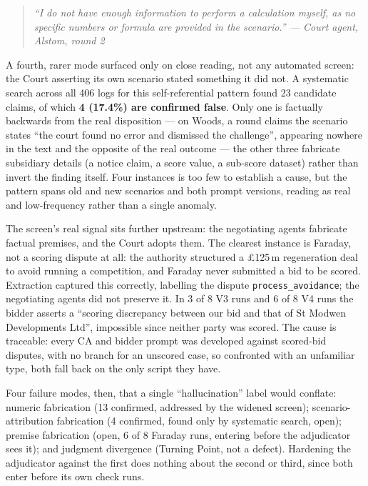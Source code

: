 \begin{quote}\itshape\small
``I do not have enough information to perform a calculation myself, as no specific
numbers or formula are provided in the scenario.''
\hfill --- Court agent, Alstom, round 2
\end{quote}

A fourth, rarer mode surfaced only on close reading, not any automated
screen: the Court asserting its own scenario stated something it did not. A
systematic search across all 406 logs for this self-referential pattern
found 23 candidate claims, of which \textbf{4 (17.4\%) are confirmed
false}. Only one is factually backwards from the real disposition --- on
Woods, a round claims the scenario states ``the court found no error and
dismissed the challenge'', appearing nowhere in the text and the opposite
of the real outcome --- the other three fabricate subsidiary details (a
notice claim, a score value, a sub-score dataset) rather than invert the
finding itself. Four instances is too few to establish a cause, but the pattern spans old
and new scenarios and both prompt versions, reading as real and
low-frequency rather than a single anomaly.

The screen's real signal sits further upstream: the negotiating agents
fabricate factual premises, and the Court adopts them. The clearest
instance is Faraday, not a scoring dispute at all: the authority structured
a \pounds125\,m regeneration deal to avoid running a competition, and
Faraday never submitted a bid to be scored. Extraction captured this
correctly, labelling the dispute \texttt{process\_avoidance}; the
negotiating agents did not preserve it. In 3 of 8 V3 runs and 6 of 8 V4
runs the bidder asserts a ``scoring discrepancy between our bid and that of
St Modwen Developments Ltd'', impossible since neither party was scored.
The cause is traceable: every CA and bidder prompt was developed against
scored-bid disputes, with no branch for an unscored case, so confronted
with an unfamiliar type, both fall back on the only script they have.

Four failure modes, then, that a single ``hallucination'' label would
conflate: numeric fabrication (13 confirmed, addressed by the widened
screen); scenario-attribution fabrication (4 confirmed, found only by
systematic search, open); premise fabrication (open, 6 of 8 Faraday runs,
entering before the adjudicator sees it); and judgment divergence (Turning
Point, not a defect). Hardening the adjudicator against the first does
nothing about the second or third, since both enter before its own check
runs.

